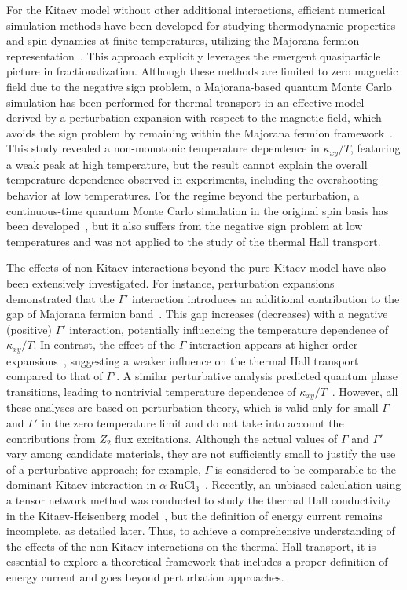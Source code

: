 \documentclass[twocolumn,superscriptaddress,showpacs, longbibliography, aps, prx]{revtex4-2}
\begin{document}
For the Kitaev model without other additional interactions, efficient numerical simulation methods have been developed for studying thermodynamic properties and spin dynamics at finite temperatures, utilizing the Majorana fermion representation~\cite{NasuUM2014,NasuUM2015,YoshitakeNM2016,YoshitakeNKM2017,YoshitakeNM2017}. 
This approach explicitly leverages the emergent quasiparticle picture in fractionalization. 
Although these methods are limited to zero magnetic field due to the negative sign problem, a Majorana-based quantum Monte Carlo simulation has been performed for thermal transport in an effective model derived by a perturbation expansion with respect to the magnetic field, which avoids the sign problem by remaining within the Majorana fermion framework~\cite{NasuYM2017}. 
This study revealed a non-monotonic temperature dependence in $\kappa_{xy}/T$, featuring a weak peak at high temperature, but the result cannot explain the overall temperature dependence observed in experiments, including the overshooting behavior at low temperatures. 
For the regime beyond the perturbation, a continuous-time quantum Monte Carlo simulation in the original spin basis has been developed~\cite{YoshitakeNKM2020}, but it also suffers from the negative sign problem at low temperatures and was not applied to the study of the thermal Hall transport. 

The effects of non-Kitaev interactions beyond the pure Kitaev model have also been extensively investigated. 
For instance, perturbation expansions demonstrated that the $\Gamma'$ 
interaction introduces an additional contribution to the gap of Majorana fermion band~\cite{TakikawaF2020}. 
This gap increases (decreases) with a negative (positive) $\Gamma'$ interaction, potentially influencing the temperature dependence of $\kappa_{xy}/T$. 
In contrast, the effect of the $\Gamma$ interaction appears at higher-order expansions~\cite{YamadaF2021}, suggesting a weaker influence on the thermal Hall transport compared to that of $\Gamma'$. 
A similar perturbative analysis predicted quantum phase transitions, leading to nontrivial temperature dependence of $\kappa_{xy}/T$~\cite{GoJM2019}. 
However, all these analyses are based on perturbation theory, which is valid only for small $\Gamma$ and $\Gamma'$ in the zero temperature limit and do not take into account the contributions from $Z_2$ flux excitations. 
Although the actual values of $\Gamma$ and $\Gamma'$ vary among candidate materials, they are not sufficiently small to justify the use of a perturbative approach; for example, $\Gamma$ is considered to be comparable to the dominant Kitaev interaction in $\alpha$-RuCl$_3$~\cite{Suzuki2018,laurell2020dynamical,Maksimov2020}. 
Recently, an unbiased calculation using a tensor network method was conducted to study the thermal Hall conductivity in the Kitaev-Heisenberg model~\cite{KumarT2023}, but the definition of energy current remains incomplete, as detailed later. 
Thus, to achieve a comprehensive understanding of the effects of the non-Kitaev interactions on the thermal Hall transport, it is essential to explore a theoretical framework that includes a proper definition of energy current and goes beyond perturbation approaches.
\end{document}
